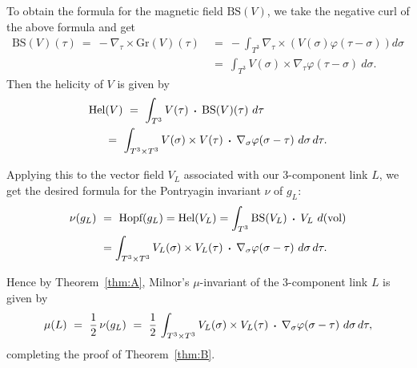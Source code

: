 \documentclass[11pt]{amsart}
\theoremstyle{definition}
\newcommand{\thmref}[1]{Theorem~\ref{#1}}
\def\dt{\,\raisebox{.2ex}{\text{\tiny\textbullet}}\,}
\def\dtw{\,\dt\,}
\begin{document}
To obtain the formula for the magnetic field $\text{BS}(V)$, we take the negative curl of the above formula and get
\begin{align*}
	\text{BS}(V)(\tau) \ = \ -\nabla_\tau \times \text{Gr}(V)(\tau) \ & = \ -\int_{T^3} \nabla_\tau \times \left(V(\sigma) \varphi(\tau - \sigma)\right)d\sigma \\
	& = \ \int_{T^3} V(\sigma) \times \nabla_\tau \varphi(\tau - \sigma) \ d\sigma.
\end{align*}
Then the helicity of $V$ is given by
\begin{align*}
	\text{Hel}& (V) \ = \ \int_{T^3} V(\tau) \dtw \text{BS}(V)(\tau) \ d\tau \\
	& = \ \int_{T^3 \times T^3} V(\sigma) \times V(\tau) \dtw \nabla_\sigma \varphi(\sigma - \tau) \ d\sigma \, d\tau.
\end{align*}

Applying this to the vector field $V_L$ associated with our 3-component link $L$, we get the desired formula for the Pontryagin invariant $\nu$ of $g_L$:
\begin{align*}
	\nu(g_L) \ &= \ \text{Hopf}(g_L) = \text{Hel}(V_L) = \int_{T^3} \text{BS}(V_L) \dtw V_L \ d(\text{vol}) \\
	&= \int_{T^3 \times T^3} V_L(\sigma) \times V_L(\tau) \dtw \nabla_\sigma \varphi(\sigma-\tau) \ d \sigma \, d \tau.
\end{align*}

Hence by Theorem~\ref{thm:A}, Milnor's $\mu$-invariant of the 3-component link $L$ is given by 
\[
	\mu(L) \ = \ \frac12\,\nu(g_L) \ = \ \frac12\, \int_{T^3 \times T^3} V_L(\sigma) \times V_L(\tau) \dtw \nabla_\sigma \varphi(\sigma-\tau) \ d\sigma \, d\tau,
\]
completing the proof of \thmref{thm:B}.


\end{document}
